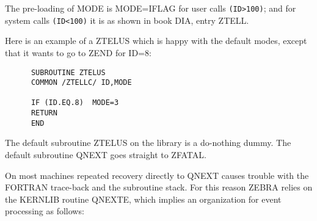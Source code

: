 The pre-loading of MODE is  MODE=IFLAG  for user calls {\tt (ID>100)};
and for system calls {\tt (ID<100)} it is as shown
in book DIA, entry ZTELL.

Here is an example of a ZTELUS
which is happy with the default modes,
except that it wants to go to ZEND for ID=8:

\begin{verbatim}
      SUBROUTINE ZTELUS
      COMMON /ZTELLC/ ID,MODE

      IF (ID.EQ.8)  MODE=3
      RETURN
      END
\end{verbatim} 
The default subroutine ZTELUS on the library is a do-nothing dummy.
The default subroutine QNEXT goes straight to ZFATAL.

On most machines repeated recovery directly to QNEXT causes
trouble with the FORTRAN trace-back and the subroutine stack.
For this reason ZEBRA relies on the KERNLIB routine QNEXTE,
which implies an organization for event processing as follows:

